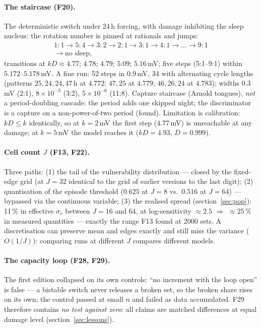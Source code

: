 \documentclass[11pt,a4paper]{article}
\theoremstyle{remark}
\begin{document}
\paragraph{The staircase (F20).}\label{sec:staircase}
The deterministic switch under 24\,h forcing, with
damage inhibiting the sleep nucleus: the rotation number is pinned at rationals and
jumps:
\begin{equation}\label{eq:stair}
\begin{gathered}
1{:}1\to5{:}4\to3{:}2\to2{:}1\to3{:}1\to4{:}1\to\dots\to9{:}1\\
\to\text{no sleep},
\end{gathered}
\end{equation}
transitions at $kD\approx4.77$; $4.78$; $4.79$; $5.09$; $5.16$\,mV; five steps
(5:1--9:1) within $5.172$--$5.178$\,mV. A fine run: 52 steps in $0.9$\,mV, 34 with
alternating cycle lengths (patterns $25,24,24,47$\,h at $4.772$; $47,25$ at $4.779$;
$46,26,24$ at $4.783$); widths $0.3$\,mV (2:1), $8\times10^{-3}$ (3:2),
$5\times10^{-6}$ (11:8). Capture staircase (Arnold tongues), \emph{not} a
period-doubling cascade: the period adds one skipped night; the discriminator is a
capture on a non-power-of-two period (found). Limitation is calibration: $kD\le k$
identically, so at $k=2$\,mV the first step ($4.77$\,mV) is unreachable at any damage;
at $k=5$\,mV the model reaches it ($kD=4.93$, $D=0.999$).

\paragraph{Cell count $J$ (F13, F22).}\label{sec:J}
Three paths: (1) the tail of the vulnerability distribution --- closed by the
fixed-edge grid (at $J=32$ identical to the grid of earlier versions to the last digit); (2)
quantisation of the episode threshold ($0.625$ at $J=8$ vs.\ $0.516$ at $J=64$) ---
bypassed via the continuous variable; (3) the realised spread (section~\ref{sec:pop}):
11\,\% in effective $\sigma_v$ between $J=16$ and $64$, at log-sensitivity $\approx2.5$
$\Rightarrow$ $\approx25\,\%$ in measured quantities --- exactly the range F13 found at
2000 sets. A discretisation can preserve mean and edges exactly and still miss the
variance ($O(1/J)$): comparing runs at different $J$ compares different models.

\paragraph{The capacity loop (F28, F29).} The first edition collapsed on its own
controls: ``no increment with the loop open'' is false --- a bistable switch never
releases a broken set, so the broken share rises on its own; the control passed at
small $n$ and failed as data accumulated. F29 therefore contains \emph{no test against
zero}: all claims are matched differences at equal damage level (section~\ref{sec:lessons}).
\end{document}
